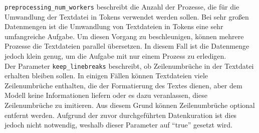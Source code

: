 \texttt{preprocessing\_num\_workers} beschreibt die Anzahl der Prozesse, die für die Umwandlung der Textdatei in Tokens verwendet werden sollen.
Bei sehr großen Datenmengen ist die Umwandlung von Textdateien in Tokens eine sehr umfangreiche Aufgabe.
Um diesen Vorgang zu beschleunigen, können mehrere Prozesse die Textdateien parallel übersetzen.
In diesem Fall ist die Datenmenge jedoch klein genug, um die Aufgabe mit nur einem Prozess zu erledigen.\\

Der Parameter \texttt{keep\_linebreaks} beschreibt, ob Zeilenumbrüche in der Textdatei erhalten bleiben sollen.
In einigen Fällen können Textdateien viele Zeilenumbrüche enthalten, die der Formatierung des Textes dienen, aber dem Modell keine Informationen liefern oder es dazu veranlassen, diese Zeilenumbrüche zu imitieren.
Aus diesem Grund können Zeilenumbrüche optional entfernt werden.
Aufgrund der zuvor durchgeführten Datenkuration ist dies jedoch nicht notwendig, weshalb dieser Parameter auf \enquote{true} gesetzt wird.\\

